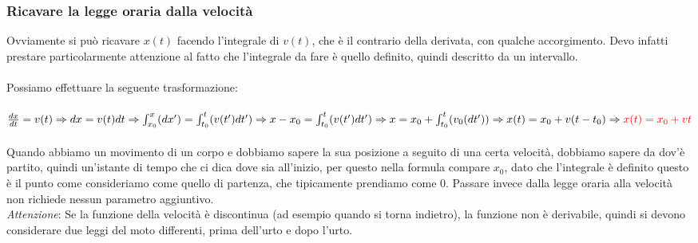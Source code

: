 \documentclass[a4paper,12pt]{report}
\begin{document}
	\subsubsection{Ricavare la legge oraria dalla velocità}
	Ovviamente si può ricavare $x(t)$ facendo l'integrale di $v(t)$, che è il contrario della derivata, con qualche accorgimento. Devo infatti prestare particolarmente attenzione al fatto che l'integrale da fare è quello definito, quindi descritto da un intervallo.\\\\
	Possiamo effettuare la seguente trasformazione:\\\\
	${\frac{dx}{dt} = v(t)}\Rightarrow\\{{dx} = {v(t)dt}} \Rightarrow\\{\int_{x_0}^{x}(dx')} = {\int_{t_0}^{t}(v(t')dt')} \Rightarrow\\{x-x_0} = {\int_{t_0}^{t}(v(t')dt')}\Rightarrow\\{x} = {x_0} + {\int_{t_0}^{t}(v_0(dt'))}\Rightarrow\\x(t) = x_0 + v(t-t_0)\Rightarrow \mathcolor{red}{x(t) = x_0 + vt}$\\\\
	Quando abbiamo un movimento di un corpo e dobbiamo sapere la sua posizione a seguito di una certa velocità, dobbiamo sapere da dov'è partito, quindi un'istante di tempo che ci dica dove sia all'inizio, per questo nella formula compare $x_0$, dato che l'integrale è definito questo è il punto come consideriamo come quello di partenza, che tipicamente prendiamo come $0$. Passare invece dalla legge oraria alla velocità non richiede nessun parametro aggiuntivo.\\ \textit{Attenzione}: Se la funzione della velocità è discontinua (ad esempio quando si torna indietro), la funzione non è derivabile, quindi si devono considerare due leggi del moto differenti, prima dell'urto e dopo l'urto.
\end{document}
